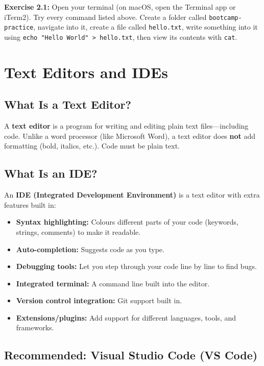 \documentclass[12pt, a4paper, oneside]{book}
\begin{document}
\begin{exercisebox}
\textbf{Exercise 2.1:} Open your terminal (on macOS, open the Terminal app or iTerm2). Try every command listed above. Create a folder called \texttt{bootcamp-practice}, navigate into it, create a file called \texttt{hello.txt}, write something into it using \texttt{echo "Hello World" > hello.txt}, then view its contents with \texttt{cat}.
\end{exercisebox}

\section{Text Editors and IDEs}

\subsection{What Is a Text Editor?}

A \textbf{text editor} is a program for writing and editing plain text files---including code. Unlike a word processor (like Microsoft Word), a text editor does \textbf{not} add formatting (bold, italics, etc.). Code must be plain text.

\subsection{What Is an IDE?}

An \textbf{IDE (Integrated Development Environment)} is a text editor with extra features built in:

\begin{itemize}[leftmargin=2em]
    \item \textbf{Syntax highlighting:} Colours different parts of your code (keywords, strings, comments) to make it readable.
    \item \textbf{Auto-completion:} Suggests code as you type.
    \item \textbf{Debugging tools:} Let you step through your code line by line to find bugs.
    \item \textbf{Integrated terminal:} A command line built into the editor.
    \item \textbf{Version control integration:} Git support built in.
    \item \textbf{Extensions/plugins:} Add support for different languages, tools, and frameworks.
\end{itemize}

\subsection{Recommended: Visual Studio Code (VS Code)}
\end{document}
